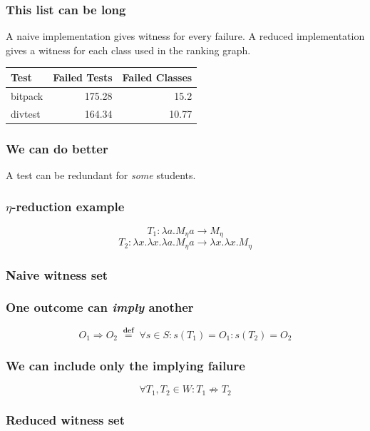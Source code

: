 \documentclass[svgnames,14pt]{beamer}
\newcommand\defined{\mathrel{\;\stackrel{\scriptscriptstyle\mathbf{def}}{=}\;}}
\theoremstyle{definition}
\begin{document}
\begin{frame}
\frametitle{This list can be long}
A naive implementation gives witness for every failure.
\newline\newline
A reduced implementation gives a witness for each class used in the ranking graph.
\end{frame}


\begin{frame}
\def\?{\phantom0}
\begin{center}
\begin{tabular}{ | l | r | r |}
\hline
Test & Failed Tests & Failed Classes \\
\hline
bitpack & 175.28 & 15.2 \\
divtest & 164.34 & 10.77 \\
\hline
\end{tabular}
\end{center}
\end{frame}

\begin{frame}
\frametitle{We can do better}
A test can be redundant for \emph{some} students.
\end{frame}

\begin{frame}
\frametitle{$\eta$-reduction example}
$$T_1 : \lambda a.M_\eta a \longrightarrow M_\eta$$
$$T_2 : \lambda x.\lambda x.\lambda a.M_\eta a \longrightarrow \lambda x.\lambda x.M_\eta$$
\end{frame}

\begin{frame}
\frametitle{Naive witness set}
\fontsize{8.3}{6.5}\selectfont

\end{frame}

\begin{frame}
\frametitle{One outcome can \emph{imply} another}
\begin{block}{}
$$O_1 \Rightarrow O_2 \defined \forall s \in S : s(T_1) = O_1 : s(T_2) = O_2$$
\end{block}
\end{frame}

\begin{frame}
\frametitle{We can include only the implying failure}
\begin{block}{}
$$\forall T_1, T_2 \in W : T_1 \not\Rightarrow T_2$$
\end{block}
\end{frame}

\begin{frame}
\frametitle{Reduced witness set}
\fontsize{8.3}{6.5}\selectfont

\end{frame}
\end{document}
